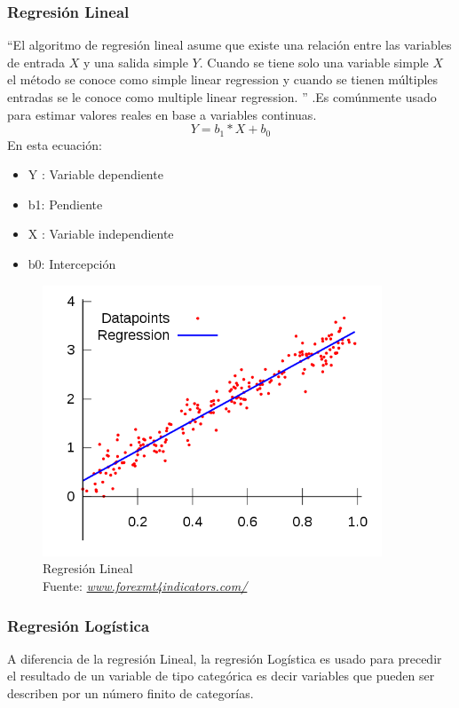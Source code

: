 \subsubsection*{Regresión Lineal}
\textquotedblleft El algoritmo de regresión lineal asume que existe una relación entre las variables de entrada $X$ y una salida simple $Y$.  Cuando se tiene solo una variable simple $X$ el método se conoce como simple linear regression y cuando se tienen múltiples entradas se le conoce como multiple linear regression.  \textquotedblright \cite{WEBSITE:3} .Es comúnmente usado para estimar valores reales en base a variables continuas.
\begin{equation}
\label{Simple learning regression}
Y=b_{1}*X+b_{0}
\end{equation} 
En esta ecuación:
\begin{itemize}
	\item Y : Variable dependiente
	\item b1: Pendiente
	\item X : Variable independiente
	\item b0: Intercepción
\end{itemize}
\begin{figure}[H]
	\centering
	\includegraphics[width=0.9\textwidth]{Figures/Linear.png}
	\caption{Regresión Lineal \\ Fuente:  \href{https://www.forexmt4indicators.com/linear-regression-mt4-indicator/}{\textit{www.forexmt4indicators.com/}}}
	\label{Regresión Lineal}
\end{figure} 

\subsubsection*{Regresión Logística}
A diferencia de la regresión Lineal, la regresión Logística es usado para precedir el resultado de un variable de tipo categórica es decir variables que pueden ser describen por un número finito de categorías.

